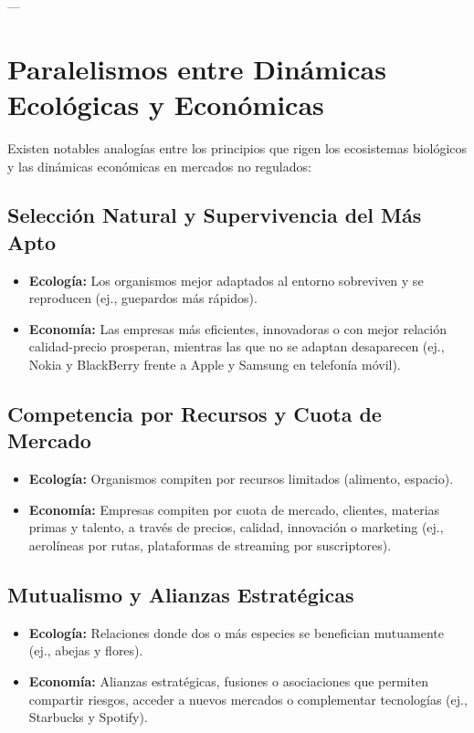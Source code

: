 \documentclass{article}
\begin{document}
---

\section{Paralelismos entre Dinámicas Ecológicas y Económicas}

Existen notables analogías entre los principios que rigen los ecosistemas biológicos y las dinámicas económicas en mercados no regulados:

\subsection{Selección Natural y Supervivencia del Más Apto}
\begin{itemize}
    \item \textbf{Ecología:} Los organismos mejor adaptados al entorno sobreviven y se reproducen (ej., guepardos más rápidos).
    \item \textbf{Economía:} Las empresas más eficientes, innovadoras o con mejor relación calidad-precio prosperan, mientras las que no se adaptan desaparecen (ej., Nokia y BlackBerry frente a Apple y Samsung en telefonía móvil).
\end{itemize}

\subsection{Competencia por Recursos y Cuota de Mercado}
\begin{itemize}
    \item \textbf{Ecología:} Organismos compiten por recursos limitados (alimento, espacio).
    \item \textbf{Economía:} Empresas compiten por cuota de mercado, clientes, materias primas y talento, a través de precios, calidad, innovación o marketing (ej., aerolíneas por rutas, plataformas de streaming por suscriptores).
\end{itemize}

\subsection{Mutualismo y Alianzas Estratégicas}
\begin{itemize}
    \item \textbf{Ecología:} Relaciones donde dos o más especies se benefician mutuamente (ej., abejas y flores).
    \item \textbf{Economía:} Alianzas estratégicas, fusiones o asociaciones que permiten compartir riesgos, acceder a nuevos mercados o complementar tecnologías (ej., Starbucks y Spotify).
\end{itemize}
\end{document}

